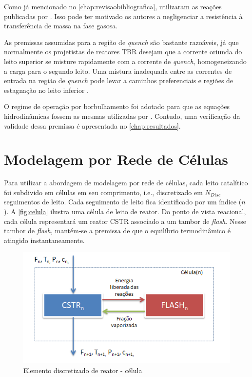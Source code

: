 Como já mencionado no \autoref{chap:revisaobibliografica},
 utilizaram as reações publicadas por
. Isso pode ter motivado os autores a negligenciar a
resistência à transferência de massa na fase gasosa.

As premissas assumidas para a região de \emph{quench} são bastante razoáveis, já
que normalmente os projetistas de reatores TBR desejam que a corrente oriunda do
leito superior se misture rapidamente com a corrente de \emph{quench},
homogeneizando a carga para o segundo leito. Uma mistura inadequada entre as
correntes de entrada na região de \emph{quench} pode levar a caminhos
preferenciais e regiões de estagnação no leito inferior \cite{Ancheyta2011}.

O regime de operação por borbulhamento foi adotado para que as
equações hidrodinâmicas fossem as mesmas utilizadas por .
Contudo, uma verificação da validade dessa premissa é apresentada no
\autoref{chap:resultados}.

\section{Modelagem por Rede de Células} \label{sec:modelagemredecelulas}

Para utilizar a abordagem de modelagem por rede de células, cada leito
catalítico foi subdivido em células em seu comprimento, i.e., discretizado em
$N_{Disc}$ seguimentos de leito. Cada seguimento de leito fica identificado por
um índice ($n$). A \autoref{fig:celula} ilustra uma célula de leito de
reator. Do ponto de vista reacional, cada célula representará um reator CSTR
associado a um tambor de \emph{flash}. Nesse tambor de \emph{flash}, mantém-se a
premissa de que o equilíbrio termodinâmico é atingido instantaneamente.

 \begin{figure}[htb]
 \centering \includegraphics[scale=0.75]{images/Chap3/celula.png}
 \caption{Elemento discretizado de reator - célula}
 \label{fig:celula}
 \end{figure}

